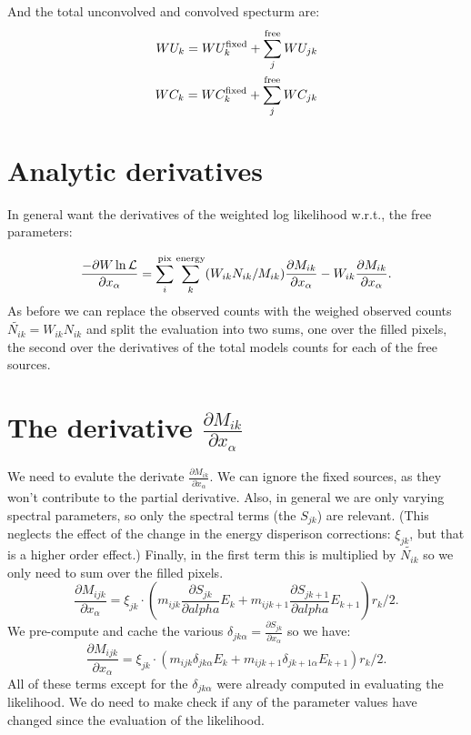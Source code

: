 \documentclass[preprint]{aastex}
\begin{document}
And the total unconvolved and convolved specturm are:
\begin{eqnarray}
  WU_{k} = WU_{k}^{\rm fixed} + \sum_j^{\rm free} WU_{jk} \nonumber \\
  WC_{k} = WC_{k}^{\rm fixed} + \sum_j^{\rm free} WC_{jk} 
\end{eqnarray}


\section{Analytic derivatives}

In general want the derivatives of the weighted log likelihood w.r.t., the 
free parameters:

\begin{equation}
  \frac{-\partial W \ln \mathcal{L}}{\partial x_{\alpha}} = \sum_i^{\rm pix} \sum_k^{\rm energy} (W_{ik} N_{ik} / M_{ik}) \frac{\partial M_{ik}}{\partial x_{\alpha}} - W_{ik} \frac{\partial M_{ik}}{\partial x_{\alpha}}.
\end{equation}
As before we can replace the observed counts with the weighed observed counts $\tilde{N_{ik}} = W_{ik} N_{ik}$ and split the 
evaluation into two sums, one over the filled pixels, the second over the derivatives of the total models counts 
for each of the free sources.


\section{The derivative $\frac{\partial M_{ik}}{\partial x_{\alpha}}$}

We need to evalute the derivate $\frac{\partial M_{ik}}{\partial x_{\alpha}}$.  We can ignore the fixed sources, as they won't contribute to the partial derivative.  Also, in general we are only varying spectral parameters, so only the spectral terms (the $S_{jk}$) are relevant.  (This neglects the effect of the change in the energy disperison corrections: $\xi_{jk}$, but that is a higher order effect.)  Finally, in the first term this is multiplied by $\tilde{N_{ik}}$ so we only need to sum over the filled pixels.  
\begin{equation}
  \frac{\partial M_{ijk}}{\partial x_{\alpha}} = \xi_{jk} \cdot (m_{ijk} \frac{\partial S_{jk}}{\partial alpha} E_k +  m_{ijk+1} \frac{\partial S_{jk+1}}{\partial alpha} E_{k+1}) r_k / 2.
\end{equation}
We pre-compute and cache the various $\delta_{jk\alpha} = \frac{\partial S_{jk}}{\partial x_{\alpha}}$ so we have:
\begin{equation}
  \frac{\partial M_{ijk}}{\partial x_{\alpha}} = \xi_{jk} \cdot (m_{ijk} \delta_{jk\alpha} E_k +  m_{ijk+1} \delta_{jk+1\alpha} E_{k+1}) r_k / 2.
\end{equation}
All of these terms except for the $\delta_{jk\alpha}$ were already computed in evaluating the likelihood.  We do need to make check if any of the 
parameter values have changed since the evaluation of the likelihood.  
\end{document}
